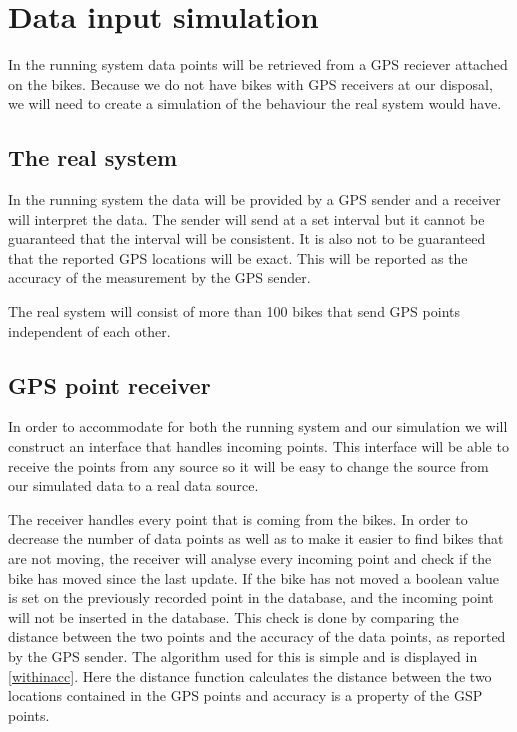 \section{Data input simulation}\label{design:datasimulation}

In the running system data points will be retrieved from a GPS reciever attached on the bikes.
Because we do not have bikes with GPS receivers at our disposal, we will need to create a simulation of the behaviour the real system would have.

\subsection{The real system}
In the running system the data will be provided by a GPS sender and a receiver will interpret the data.
The sender will send at a set interval but it cannot be guaranteed that the interval will be consistent. 
It is also not to be guaranteed that the reported GPS locations will be exact.
This will be reported as the accuracy of the measurement by the GPS sender.

The real system will consist of more than 100 bikes that send GPS points independent of each other.

\subsection{GPS point receiver}\label{design:datareceiver}
In order to accommodate for both the running system and our simulation we will construct an interface that handles incoming points.
This interface will be able to receive the points from any source so it will be easy to change the source from our simulated data to a real data source.

The receiver handles every point that is coming from the bikes.
In order to decrease the number of data points as well as to make it easier to find bikes that are not moving, the receiver will analyse every incoming point and check if the bike has moved since the last update.
If the bike has not moved a boolean value is set on the previously recorded point in the database, and the incoming point will not be inserted in the database.
This check is done by comparing the distance between the two points and the accuracy of the data points, as reported by the GPS sender.
The algorithm used for this is simple and is displayed in \cref{withinacc}.
Here the distance function calculates the distance between the two locations contained in the GPS points and accuracy is a property of the GSP points.

